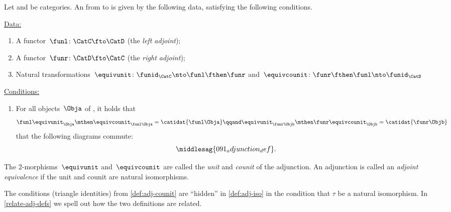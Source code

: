 \begin{ctdefinition}
    \label{def:adj-counit}
    \label{def:cat-adjunction-v2}
    Let \CatC and \CatD be categories.
    An \emph{} from \CatC to \CatD is given by the following data, satisfying the following conditions.

    \underline{Data:}
    \begin{enumerate}
        \item A functor~$\funl \colon \CatC \fto \CatD$ (the \emph{left adjoint});
        \item A functor~$\funr \colon \CatD \fto \CatC$ (the \emph{right adjoint});
        \item Natural transformations~$\equivunit \colon \funid_\CatC \nto \funl  \fthen \funr $ and~$\equivcounit\colon \funr \fthen \funl \nto \funid_\CatD$
    \end{enumerate}

    \underline{Conditions:}
    \begin{enumerate}
        \item For all objects~$\Obja$ of \CatC, it holds that
              \begin{equation}
                  \funl \equivunit_\Obja \mthen \equivcounit_{\funl\Obja} = \catidat{\funl\Obja} \qqand
                  \equivunit_{\funr\Objb} \mthen \funr\equivcounit_\Objb = \catidat{\funr\Objb}
              \end{equation}
              \text{\ie } that the following diagrams commute:
              \begin{equation}
                  \middlesag{091_adjunction_def}.
              \end{equation}
    \end{enumerate}

    The 2-morphisms~$\equivunit$ and~$\equivcounit$ are called the \emph{unit} and \emph{counit} of the adjunction.
    An adjunction is called an \emph{adjoint equivalence} if the unit and counit are natural isomorphisms.
\end{ctdefinition}

\begin{remark}
    The conditions (triangle identities) from \cref{def:adj-counit} are ``hidden'' in \cref{def:adj-iso} in the condition that $\tau$ be a natural isomorphism.
    In \cref{relate-adj-defs} we spell out how the two definitions are related.
\end{remark}
